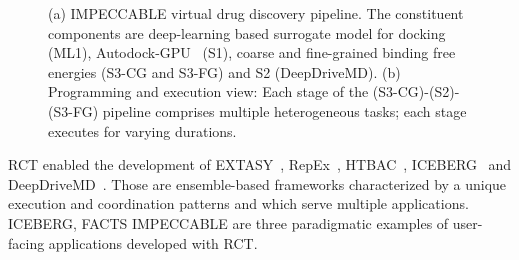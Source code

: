 \documentclass[preprint,12pt, a4paper]{elsarticle}
\begin{document}
\begin{figure}[h]
        \centering
        \qquad
        \caption{(a) IMPECCABLE virtual drug discovery pipeline. The constituent
        components are deep-learning based surrogate model for docking (ML1),
        Autodock-GPU~\cite{legrand2020gpu} (S1), coarse and fine-grained binding
        free energies (S3-CG and S3-FG) and S2 (DeepDriveMD). (b) Programming
        and execution view: Each stage of the (S3-CG)-(S2)-(S3-FG) pipeline
        comprises multiple heterogeneous tasks; each stage executes for varying
        durations.}\label{fig:impeccable}
\end{figure}

RCT enabled the development of EXTASY~\cite{balasubramanian2016extasy},
RepEx~\cite{treikalis2016repex}, HTBAC~\cite{dakka2018high},
ICEBERG~\cite{paraskevakos2019workflow} and
DeepDriveMD~\cite{lee2019deepdrivemd}. Those are ensemble-based frameworks
characterized by a unique execution and coordination patterns and which serve
multiple applications. ICEBERG, FACTS  IMPECCABLE are three paradigmatic examples
of user-facing applications developed with RCT.

\end{document}
